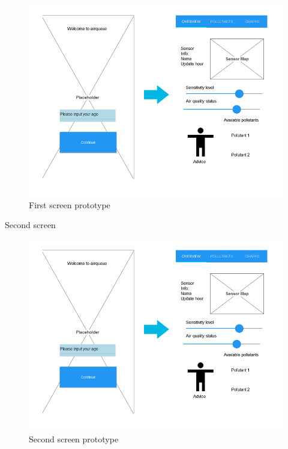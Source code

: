 \begin{figure}[H]
\begin{adjustbox}{width=1\textwidth,center=\textwidth}
  \centering
  \includegraphics[scale=1]{images/prototype1_screen1.png}
\end{adjustbox}
  \caption[First screen prototype]{First screen prototype}
  \label{fig:android_material_design}
\end{figure}

Second screen

\begin{figure}[H]
\begin{adjustbox}{width=1\textwidth,center=\textwidth}
  \centering
  \includegraphics[scale=1]{images/prototype1_screen1.png}
\end{adjustbox}
  \caption[Second screen prototype]{Second screen prototype}
  \label{fig:android_material_design}
\end{figure}

